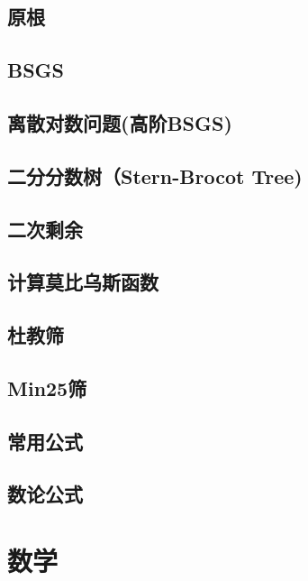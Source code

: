 \section{原根}
\raggedbottom
\hrulefill
\section{BSGS}
\raggedbottom
\hrulefill
\section{离散对数问题(高阶BSGS)}
\raggedbottom
\hrulefill
\section{二分分数树（Stern-Brocot Tree)}
\raggedbottom
\hrulefill
\section{	二次剩余}
\raggedbottom
\hrulefill
\section{计算莫比乌斯函数}
\raggedbottom
\hrulefill
\section{杜教筛}
\raggedbottom
\hrulefill
\section{Min25筛}
\raggedbottom
\hrulefill
\section{常用公式}
\raggedbottom
\hrulefill
\section{数论公式}
\raggedbottom
\hrulefill

\chapter{数学}
